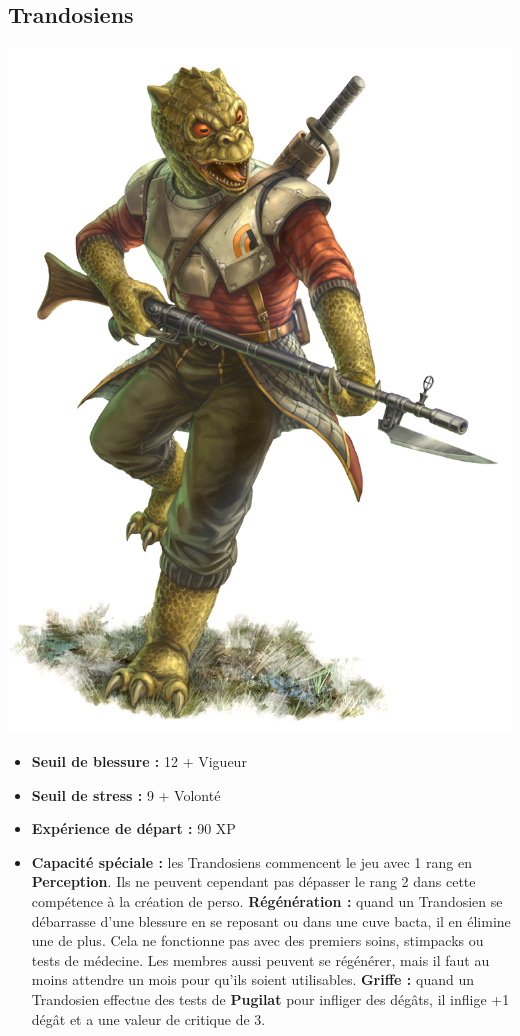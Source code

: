 \documentclass[twoside]{article}
\begin{document}
\subsection*{Trandosiens}

\noindent\begin{minipage}{0.3\textwidth}
	\includegraphics[width=1\linewidth]{../img/species/trandoshan}
\end{minipage}%
\hfill%
\begin{minipage}{0.7\textwidth}\raggedleft
	\begin{itemize}
		\item \textbf{Seuil de blessure :} 12 + Vigueur 
		\item \textbf{Seuil de stress :} 9 + Volonté 
		\item \textbf{Expérience de départ :} 90 XP
		\item \textbf{Capacité spéciale :} les Trandosiens commencent le jeu avec 1 rang en \textbf{Perception}. Ils ne peuvent cependant pas dépasser le rang 2 dans cette compétence à la création de perso. \textbf{Régénération :} quand un Trandosien se débarrasse d'une blessure en se reposant ou dans une cuve bacta, il en élimine une de plus. Cela ne fonctionne pas avec des premiers soins, stimpacks ou tests de médecine. Les membres aussi peuvent se régénérer, mais il faut au moins attendre un mois pour qu'ils soient utilisables. \textbf{Griffe :} quand un Trandosien effectue des tests de \textbf{Pugilat} pour infliger des dégâts, il inflige +1 dégât et a une valeur de critique de 3.
	\end{itemize}
\end{minipage}
\end{document}
